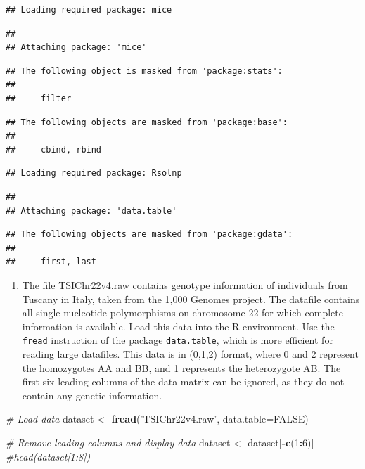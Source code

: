 \documentclass[
]{article}
\newenvironment{Shaded}{\begin{snugshade}}{\end{snugshade}}
\newcommand{\CommentTok}[1]{\textcolor[rgb]{0.56,0.35,0.01}{\textit{#1}}}
\newcommand{\DataTypeTok}[1]{\textcolor[rgb]{0.13,0.29,0.53}{#1}}
\newcommand{\DecValTok}[1]{\textcolor[rgb]{0.00,0.00,0.81}{#1}}
\newcommand{\KeywordTok}[1]{\textcolor[rgb]{0.13,0.29,0.53}{\textbf{#1}}}
\newcommand{\NormalTok}[1]{#1}
\newcommand{\OperatorTok}[1]{\textcolor[rgb]{0.81,0.36,0.00}{\textbf{#1}}}
\newcommand{\OtherTok}[1]{\textcolor[rgb]{0.56,0.35,0.01}{#1}}
\newcommand{\StringTok}[1]{\textcolor[rgb]{0.31,0.60,0.02}{#1}}
\providecommand{\tightlist}{%
  \setlength{\itemsep}{0pt}\setlength{\parskip}{0pt}}
\begin{document}
\begin{verbatim}
## Loading required package: mice
\end{verbatim}

\begin{verbatim}
## 
## Attaching package: 'mice'
\end{verbatim}

\begin{verbatim}
## The following object is masked from 'package:stats':
## 
##     filter
\end{verbatim}

\begin{verbatim}
## The following objects are masked from 'package:base':
## 
##     cbind, rbind
\end{verbatim}

\begin{verbatim}
## Loading required package: Rsolnp
\end{verbatim}

\begin{verbatim}
## 
## Attaching package: 'data.table'
\end{verbatim}

\begin{verbatim}
## The following objects are masked from 'package:gdata':
## 
##     first, last
\end{verbatim}

\begin{enumerate}
\def\labelenumi{\arabic{enumi}.}
\tightlist
\item
  The file
  \href{http://www-eio.upc.es/~jan/data/bsg/TSIChr22v4.raw}{TSIChr22v4.raw}
  contains genotype information of individuals from Tuscany in Italy,
  taken from the 1,000 Genomes project. The datafile contains all single
  nucleotide polymorphisms on chromosome 22 for which complete
  information is available. Load this data into the R environment. Use
  the \texttt{fread} instruction of the package \texttt{data.table},
  which is more efficient for reading large datafiles. This data is in
  (0,1,2) format, where 0 and 2 represent the homozygotes AA and BB, and
  1 represents the heterozygote AB. The first six leading columns of the
  data matrix can be ignored, as they do not contain any genetic
  information.
\end{enumerate}

\begin{Shaded}
\begin{Highlighting}[]
\CommentTok{# Load data}
\NormalTok{dataset <-}\StringTok{ }\KeywordTok{fread}\NormalTok{(}\StringTok{'TSIChr22v4.raw'}\NormalTok{, }\DataTypeTok{data.table=}\OtherTok{FALSE}\NormalTok{)}

\CommentTok{# Remove leading columns and display data}
\NormalTok{dataset <-}\StringTok{ }\NormalTok{dataset[}\OperatorTok{-}\KeywordTok{c}\NormalTok{(}\DecValTok{1}\OperatorTok{:}\DecValTok{6}\NormalTok{)]}
\CommentTok{#head(dataset[1:8])}
\end{Highlighting}
\end{Shaded}
\end{document}
